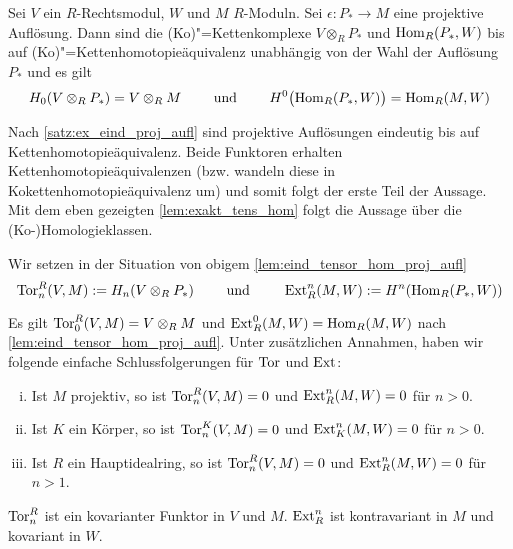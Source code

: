 \begin{lemma}[{name=[{Eindeutigkeit von projektiven Auflösungen nach Tensorieren und Hom}]},label=lem:eind_tensor_hom_proj_aufl]
	Sei $V$ ein $R$-Rechtsmodul, $W$ und $M$  $R$-Moduln.
	Sei $\epsilon \colon P_* \to M$ eine projektive Auflösung.
	Dann sind die (Ko)"=Kettenkomplexe $V \otimes_R P_*$ und $\Hom_R(P_*,W)$ bis auf (Ko)"=Kettenhomotopieäquivalenz unabhängig von der Wahl der Auflösung $P_*$ und es gilt
	\[
		H_0(V \otimes_R P_*) = V \otimes_R M \qquad \text{ und } \qquad H^0 \enbrace[\big]{\Hom_R(P_*,W)} = \Hom_R(M,W)
	\]
\end{lemma}
\begin{beweis}
	Nach \autoref{satz:ex_eind_proj_aufl} sind projektive Auflösungen eindeutig bis auf Kettenhomotopieäquivalenz.
	Beide Funktoren erhalten Kettenhomotopieäquivalenzen (bzw. wandeln diese in Kokettenhomotopieäquivalenz um) und somit folgt der erste Teil der Aussage.
	Mit dem eben gezeigten \autoref{lem:exakt_tens_hom} folgt die Aussage über die (Ko-)Homologieklassen.
\end{beweis}

\begin{definition}[{name=[Tor und Ext]}]
	Wir setzen in der Situation von obigem \autoref{lem:eind_tensor_hom_proj_aufl}
	\[
		\Tor_n^R(V,M) := H_n(V \otimes_R P_*) \qquad \text{ und } \qquad \Ext_R^n(M,W) := H^n \enbrace*{\Hom_R(P_*,W)} 
	\]
\end{definition}

\begin{bemerkung}[label=bem:tor_ext_koerper_hir,{name=[{Einfache Berechnungen von Tor und Ext}]}]
	Es gilt $\Tor_0^R(V,M) = V \otimes_R M$ und $\Ext_R^0(M,W)=\Hom_R(M,W)$ nach \autoref{lem:eind_tensor_hom_proj_aufl}.
	Unter zusätzlichen Annahmen, haben wir folgende einfache Schlussfolgerungen für $\Tor$ und $\Ext$:
	\begin{enumerate}[(i),itemsep=0pt]
		\item Ist $M$ projektiv, so ist $\Tor_n^R(V,M)=0$ und $\Ext_R^n(M,W)=0$ für $n>0$.
		\item Ist $K$ ein Körper, so ist $\Tor_n^K(V,M)=0$ und $\Ext_K^n(M,W)=0$ für $n>0$.
		\item Ist $R$ ein Hauptidealring, so ist $\Tor_n^R(V,M)=0$ und $\Ext_R^n(M,W)=0$ für $n>1$.
	\end{enumerate}
	$\Tor^R_n$ ist ein kovarianter Funktor in $V$ und $M$.
	$\Ext_R^n$ ist kontravariant in $M$ und kovariant in $W$.
\end{bemerkung}

